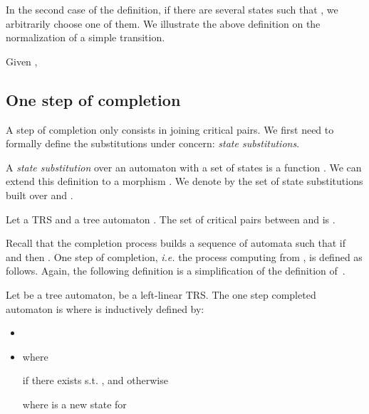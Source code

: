 \documentclass[a4paper,11pt]{llncs}
\theoremstyle{plain}
\begin{document}
\noindent
In the second case of the definition, if there are several states  such that , we arbitrarily choose one of them. We illustrate the above definition on the
normalization of a simple transition.
\begin{example}
Given , 

\end{example}



\subsection{One step of completion}
\label{sec:eqcompletionalgo}

A step of completion only consists in joining critical pairs. We first need to
formally define the substitutions under concern: {\em state substitutions}.


\begin{definition}
\label{def:qsubst}
A {\em state substitution} over an automaton
 with a
set of states  is a function . We can extend this definition to a morphism
.
We denote by  the set of state substitutions built over  and .
\end{definition}












\begin{definition}
Let a TRS  and a tree automaton . The set of critical
pairs between  and  is . 
\end{definition}

\noindent
Recall that the completion process builds a sequence
 of automata such that if 
and  then . One step of completion,
{\em i.e.} the process computing  from , is defined as follows.
Again, the following definition is a simplification of the definition of~\cite{GenetR-JSC10}.


\begin{definition}
\label{def:completion-one-step}
  Let  be a tree automaton, 
   be a left-linear TRS. 
The one step completed automaton is   where  is inductively defined by:
\begin{itemize}
\item 
\item  where 




 if there exists  s.t. , and
otherwise

 where  is a new state for
  
  
  
\end{itemize}
\end{definition}
\end{document}
